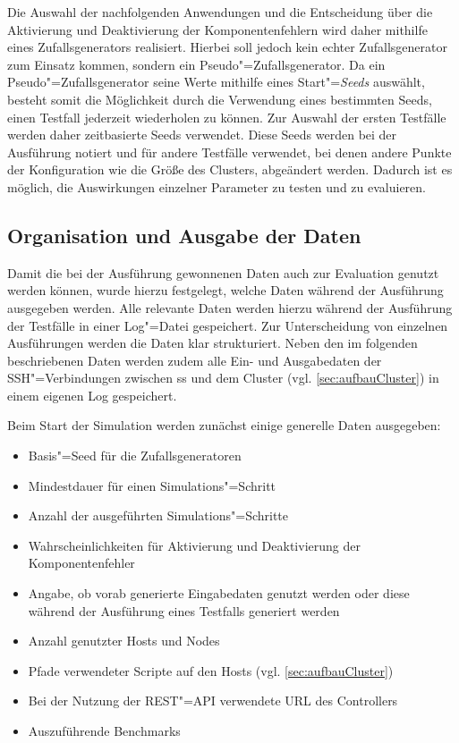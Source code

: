 Die Auswahl der nachfolgenden Anwendungen und die Entscheidung über die Aktivierung und Deaktivierung der Komponentenfehlern wird daher mithilfe eines Zufallsgenerators realisiert.
Hierbei soll jedoch kein echter Zufallsgenerator zum Einsatz kommen, sondern ein Pseudo"=Zufallsgenerator.
Da ein Pseudo"=Zufallsgenerator seine Werte mithilfe eines Start"=\emph{Seeds} auswählt, besteht somit die Möglichkeit durch die Verwendung eines bestimmten Seeds, einen Testfall jederzeit wiederholen zu können.
Zur Auswahl der ersten Testfälle werden daher zeitbasierte Seeds verwendet.
Diese Seeds werden bei der Ausführung notiert und für andere Testfälle verwendet, bei denen andere Punkte der Konfiguration wie \zB die Größe des Clusters, abgeändert werden.
Dadurch ist es möglich, die Auswirkungen einzelner Parameter zu testen und zu evaluieren.

\subsection{Organisation und Ausgabe der Daten}
\label{sec:dataOrganisation}

Damit die bei der Ausführung gewonnenen Daten auch zur Evaluation genutzt werden können, wurde hierzu festgelegt, welche Daten während der Ausführung ausgegeben werden.
Alle relevante Daten werden hierzu während der Ausführung der Testfälle in einer Log"=Datei gespeichert.
Zur Unterscheidung von einzelnen Ausführungen werden die Daten klar strukturiert.
Neben den im folgenden beschriebenen Daten werden zudem alle Ein- und Ausgabedaten der SSH"=Verbindungen zwischen \ac{ss} und dem Cluster (vgl. \autoref{sec:aufbauCluster}) in einem eigenen Log gespeichert.

Beim Start der Simulation werden zunächst einige generelle Daten ausgegeben:

\begin{itemize}
    \item Basis"=Seed für die Zufallsgeneratoren
    \item Mindestdauer für einen Simulations"=Schritt
    \item Anzahl der ausgeführten Simulations"=Schritte
    \item Wahrscheinlichkeiten für Aktivierung und Deaktivierung der Komponentenfehler
    \item Angabe, ob vorab generierte Eingabedaten genutzt werden oder diese während der Ausführung eines Testfalls generiert werden
    \item Anzahl genutzter Hosts und Nodes
    \item Pfade verwendeter Scripte auf den Hosts (vgl. \autoref{sec:aufbauCluster})
    \item Bei der Nutzung der REST"=API verwendete URL des Controllers
    \item Auszuführende Benchmarks    
\end{itemize}

